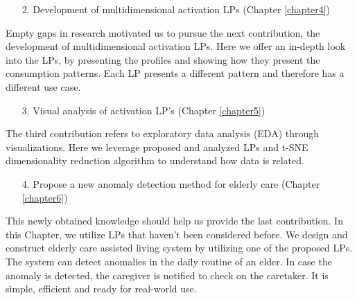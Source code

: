 \begin{enumerate}
	\item[2.] Development of multidimensional activation LPs (Chapter \ref{chapter4})
\end{enumerate}
Empty gaps in research motivated us to pursue the next contribution, 
the development of multidimensional activation LPs. 
Here we offer an in-depth look into the LPs, by presenting the profiles and showing how they present the consumption patterns.
Each LP presents a different pattern and therefore has a different use case. 

\begin{enumerate}
	\item[3.] Visual analysis of activation LP's (Chapter \ref{chapter5})
\end{enumerate}
The third contribution refers to exploratory data analysis (EDA) through visualizations.
Here we leverage proposed and analyzed LPs and t-SNE dimensionality reduction algorithm to understand how data is related.

\begin{enumerate}
	\item[4.] Propose a new anomaly detection method for elderly care (Chapter \ref{chapter6})
\end{enumerate}

This newly obtained knowledge should help us provide the last contribution.
In this Chapter, we utilize LPs that haven't been considered before.
We design and construct elderly care assisted living system by utilizing one of the proposed LPs.
The system can detect anomalies in the daily routine of an elder.
In case the anomaly is detected, the caregiver is notified to check on the caretaker. 
It is simple, efficient and ready for real-world use.
